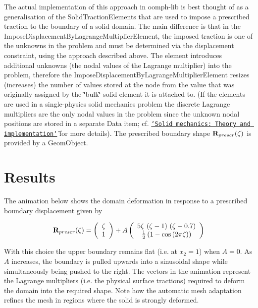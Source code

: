 The actual implementation of this approach in {\ttfamily oomph-\/lib} is best thought of as a generalisation of the {\ttfamily Solid\+Traction\+Elements} that are used to impose a prescribed traction to the boundary of a solid domain. The main difference is that in the {\ttfamily Impose\+Displacement\+By\+Lagrange\+Multiplier\+Element}, the imposed traction is one of the unknowns in the problem and must be determined via the displacement constraint, using the approach described above. The element introduces additional unknowns (the nodal values of the Lagrange multiplier) into the problem, therefore the {\ttfamily Impose\+Displacement\+By\+Lagrange\+Multiplier\+Element} resizes (increases) the number of values stored at the node from the value that was originally assigned by the \char`\"{}bulk\char`\"{} solid element it is attached to. (If the elements are used in a single-\/physics solid mechanics problem the discrete Lagrange multipliers are the only nodal values in the problem since the unknown nodal positions are stored in a separate {\ttfamily Data} item; cf. \href{../../solid_theory/html/index.html#solid_node}{\tt \char`\"{}\+Solid mechanics\+: Theory and implementation\char`\"{}} for more details). The prescribed boundary shape $ {\bf R}_{prescr}(\zeta) $ is provided by a {\ttfamily Geom\+Object}.



 

\hypertarget{index_results}{}\section{Results}\label{index_results}
The animation below shows the domain deformation in response to a prescribed boundary displacement given by

\[ {\bf R}_{prescr}(\zeta)= \left( \begin{array}{c} \zeta \\ 1 \end{array} \right) + A \left( \begin{array}{c} 5 \zeta\ (\zeta-1) \ (\zeta-0.7) \\ \frac{1}{2}\left(1-\cos\left(2\pi\zeta\right)\right) \end{array} \right) \]

With this choice the upper boundary remains flat (i.\+e. at $ x_2=1 $) when $ A=0 $. As $ A $ increases, the boundary is pulled upwards into a sinusoidal shape while simultaneously being pushed to the right. The vectors in the animation represent the Lagrange multipliers (i.\+e. the physical surface tractions) required to deform the domain into the required shape. Note how the automatic mesh adaptation refines the mesh in regions where the solid is strongly deformed.

